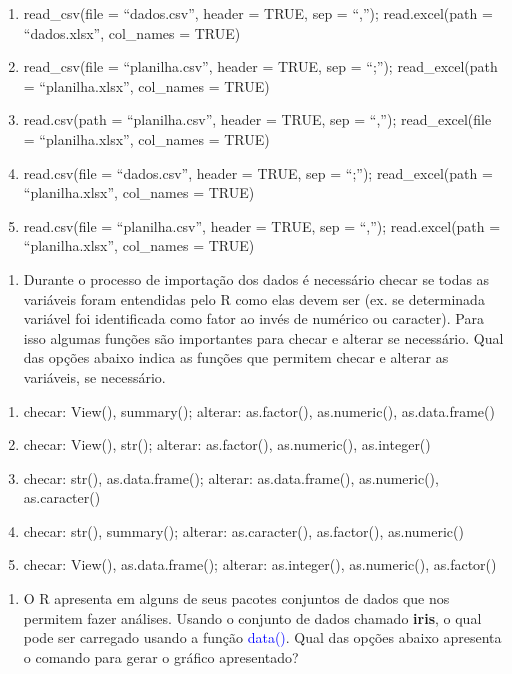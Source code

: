 \documentclass[14pt,titlepage, oneside, openany, a4paper]{book}
\providecommand{\tightlist}{%
  \setlength{\itemsep}{0pt}\setlength{\parskip}{0pt}}
\begin{document}
\begin{enumerate}
\def\labelenumi{(\alph{enumi})}
\tightlist
\item
  read\_csv(file = ``dados.csv'', header = TRUE, sep = ``,''); read.excel(path = ``dados.xlsx'', col\_names = TRUE)
\item
  read\_csv(file = ``planilha.csv'', header = TRUE, sep = ``;''); read\_excel(path = ``planilha.xlsx'', col\_names = TRUE)
\item
  read.csv(path = ``planilha.csv'', header = TRUE, sep = ``,''); read\_excel(file = ``planilha.xlsx'', col\_names = TRUE)
\item
  read.csv(file = ``dados.csv'', header = TRUE, sep = ``;''); read\_excel(path = ``planilha.xlsx'', col\_names = TRUE)
\item
  read.csv(file = ``planilha.csv'', header = TRUE, sep = ``,''); read.excel(path = ``planilha.xlsx'', col\_names = TRUE)
\end{enumerate}

\begin{enumerate}
\def\labelenumi{\arabic{enumi})}
\setcounter{enumi}{2}
\tightlist
\item
  Durante o processo de importação dos dados é necessário checar se todas as variáveis foram entendidas pelo R como elas devem ser (ex. se determinada variável foi identificada como fator ao invés de numérico ou caracter). Para isso algumas funções são importantes para checar e alterar se necessário. Qual das opções abaixo indica as funções que permitem checar e alterar as variáveis, se necessário.
\end{enumerate}

\begin{enumerate}
\def\labelenumi{(\alph{enumi})}
\tightlist
\item
  checar: View(), summary(); alterar: as.factor(), as.numeric(), as.data.frame()
\item
  checar: View(), str(); alterar: as.factor(), as.numeric(), as.integer()
\item
  checar: str(), as.data.frame(); alterar: as.data.frame(), as.numeric(), as.caracter()
\item
  checar: str(), summary(); alterar: as.caracter(), as.factor(), as.numeric()
\item
  checar: View(), as.data.frame(); alterar: as.integer(), as.numeric(), as.factor()
\end{enumerate}

\begin{enumerate}
\def\labelenumi{\arabic{enumi})}
\setcounter{enumi}{3}
\tightlist
\item
  O R apresenta em alguns de seus pacotes conjuntos de dados que nos permitem fazer análises. Usando o conjunto de dados chamado \textbf{iris}, o qual pode ser carregado usando a função \textcolor{blue}{data()}. Qual das opções abaixo apresenta o comando para gerar o gráfico apresentado?
\end{enumerate}
\end{document}
